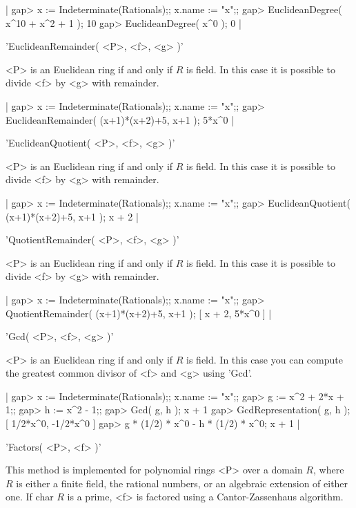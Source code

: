 |    gap> x := Indeterminate(Rationals);; x.name := "x";;
    gap> EuclideanDegree( x^10 + x^2 + 1 );
    10
    gap> EuclideanDegree( x^0 );
    0 |

\vspace{5mm}
'EuclideanRemainder( <P>, <f>, <g> )'%

<P> is an Euclidean ring if and only if $R$  is field. In this case it is
possible to divide <f> by <g> with remainder.

|    gap> x := Indeterminate(Rationals);; x.name := "x";;
    gap> EuclideanRemainder( (x+1)*(x+2)+5, x+1 );
    5*x^0 |

\vspace{5mm}
'EuclideanQuotient( <P>, <f>, <g> )'%

<P> is an Euclidean ring if and only if $R$  is field. In this case it is
possible to divide <f> by <g> with remainder.

|    gap> x := Indeterminate(Rationals);; x.name := "x";;
    gap> EuclideanQuotient( (x+1)*(x+2)+5, x+1 ); 
    x + 2 |

\vspace{5mm}
'QuotientRemainder( <P>, <f>, <g> )'%

<P> is an Euclidean ring if and only if $R$  is field. In this case it is
possible to divide <f> by <g> with remainder.

|    gap> x := Indeterminate(Rationals);; x.name := "x";;
    gap> QuotientRemainder( (x+1)*(x+2)+5, x+1 );
    [ x + 2, 5*x^0 ] |

\vspace{5mm}
'Gcd( <P>, <f>, <g> )'%

<P> is an Euclidean ring  if and only if $R$  is field. In this case  you
can compute the greatest common divisor of <f> and <g> using 'Gcd'.

|    gap> x := Indeterminate(Rationals);; x.name := "x";;
    gap> g := x^2 + 2*x + 1;;
    gap> h := x^2 - 1;;
    gap> Gcd( g, h );
    x + 1
    gap> GcdRepresentation( g, h );
    [ 1/2*x^0, -1/2*x^0 ]
    gap> g * (1/2) * x^0 - h * (1/2) * x^0;
    x + 1 |

\vspace{5mm}
'Factors( <P>, <f> )'%

This method is implemented for polynomial rings <P> over a domain $R$, where
$R$ is either a finite field, the rational numbers, or an algebraic
extension of either one.
If char $R$ is a prime, <f>  is  factored using  a  Cantor-Zassenhaus
algorithm.

